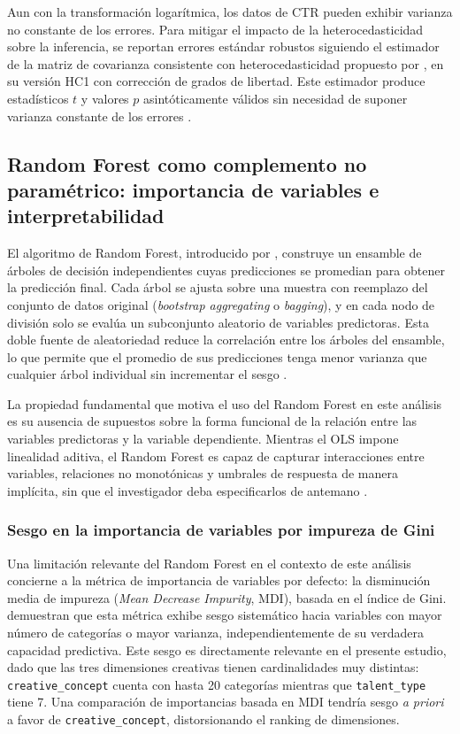\documentclass[12pt, a4paper]{report}
\begin{document}
Aun con la transformación logarítmica, los datos de CTR pueden exhibir varianza
no constante de los errores. Para mitigar el impacto de la heterocedasticidad sobre
la inferencia, se reportan errores estándar robustos siguiendo el estimador de la
matriz de covarianza consistente con heterocedasticidad propuesto por \citet{white1980},
en su versión HC1 con corrección de grados de libertad. Este estimador produce
estadísticos $t$ y valores $p$ asintóticamente válidos sin necesidad de suponer
varianza constante de los errores \citep[Cap.~12]{fox2016}.

\subsection{Random Forest como complemento no paramétrico:
            importancia de variables e interpretabilidad}

El algoritmo de Random Forest, introducido por \citet{breiman2001}, construye un
ensamble de árboles de decisión independientes cuyas predicciones se promedian para
obtener la predicción final. Cada árbol se ajusta sobre una muestra con reemplazo del
conjunto de datos original (\textit{bootstrap aggregating} o \textit{bagging}), y en
cada nodo de división solo se evalúa un subconjunto aleatorio de variables predictoras.
Esta doble fuente de aleatoriedad reduce la correlación entre los árboles del ensamble,
lo que permite que el promedio de sus predicciones tenga menor varianza que cualquier
árbol individual sin incrementar el sesgo \citep{breiman2001}.

La propiedad fundamental que motiva el uso del Random Forest en este análisis es su
ausencia de supuestos sobre la forma funcional de la relación entre las variables
predictoras y la variable dependiente. Mientras el OLS impone linealidad aditiva,
el Random Forest es capaz de capturar interacciones entre variables, relaciones no
monotónicas y umbrales de respuesta de manera implícita, sin que el investigador
deba especificarlos de antemano \citep[Cap.~15]{hastie2009}.

\subsubsection*{Sesgo en la importancia de variables por impureza de Gini}

Una limitación relevante del Random Forest en el contexto de este análisis concierne
a la métrica de importancia de variables por defecto: la disminución media de impureza
(\textit{Mean Decrease Impurity}, MDI), basada en el índice de Gini. \citet{strobl2007}
demuestran que esta métrica exhibe sesgo sistemático hacia variables con mayor número
de categorías o mayor varianza, independientemente de su verdadera capacidad predictiva.
Este sesgo es directamente relevante en el presente estudio, dado que las tres dimensiones
creativas tienen cardinalidades muy distintas: \texttt{creative\_concept} cuenta con
hasta 20 categorías mientras que \texttt{talent\_type} tiene 7. Una comparación de
importancias basada en MDI tendría sesgo \textit{a priori} a favor de \texttt{creative\_concept},
distorsionando el ranking de dimensiones.
\end{document}
